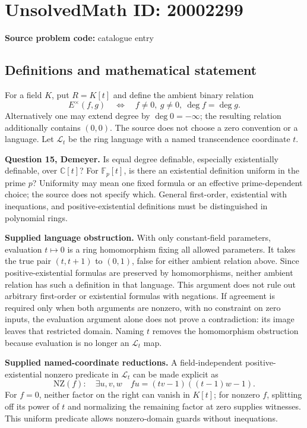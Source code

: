 \documentclass[11pt]{article}
\newcommand{\C}{\mathbb{C}}
\newcommand{\F}{\mathbb{F}}
\begin{document}
\section*{UnsolvedMath ID: 20002299}
\textbf{Source problem code:} catalogue entry
\subsection{Definitions and mathematical statement}
For a field $K$, put $R=K[t]$ and define the ambient binary relation
\[
 E^\times(f,g)\quad\Longleftrightarrow\quad
 f\ne0,\ g\ne0,\ \deg f=\deg g.
\]
Alternatively one may extend degree by $\deg0=-\infty$; the resulting relation additionally contains $(0,0)$. The source does not choose a zero convention or a language. Let $\mathcal L_t$ be the ring language with a named transcendence coordinate $t$.

\textbf{Question 15, Demeyer.} Is equal degree definable, especially existentially definable, over $\C[t]$? For $\F_p[t]$, is there an existential definition uniform in the prime $p$? Uniformity may mean one fixed formula or an effective prime-dependent choice; the source does not specify which. General first-order, existential with inequations, and positive-existential definitions must be distinguished in polynomial rings.

\textbf{Supplied language obstruction.} With only constant-field parameters, evaluation $t\mapsto0$ is a ring homomorphism fixing all allowed parameters. It takes the true pair $(t,t+1)$ to $(0,1)$, false for either ambient relation above. Since positive-existential formulas are preserved by homomorphisms, neither ambient relation has such a definition in that language. This argument does not rule out arbitrary first-order or existential formulas with negations. If agreement is required only when both arguments are nonzero, with no constraint on zero inputs, the evaluation argument alone does not prove a contradiction: its image leaves that restricted domain. Naming $t$ removes the homomorphism obstruction because evaluation is no longer an $\mathcal L_t$ map.

\textbf{Supplied named-coordinate reductions.} A field-independent positive-existential nonzero predicate in $\mathcal L_t$ can be made explicit as
\[
 \mathrm{NZ}(f):\quad\exists u,v,w\quad
 fu=(tv-1)((t-1)w-1).
\]
For $f=0$, neither factor on the right can vanish in $K[t]$; for nonzero $f$, splitting off its power of $t$ and normalizing the remaining factor at zero supplies witnesses. This uniform predicate allows nonzero-domain guards without inequations.
\end{document}
